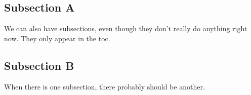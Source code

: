 \subsection{Subsection A}
\begin{frame}{\mbox{}}
We can also have subsections, even though they don't really do anything right now. They only appear in the toc. 
\end{frame}
%
%
%
%
%
\subsection{Subsection B}
\begin{frame}{\mbox{}}
When there is one subsection, there probably should be another.
\end{frame}
%
%
%
%
%
